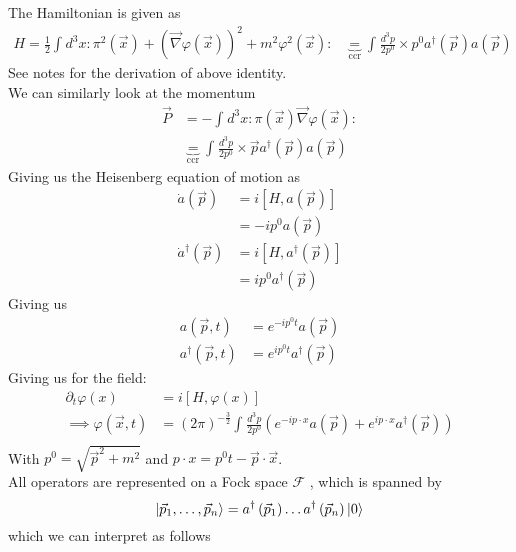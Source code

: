 \documentclass{report}
\begin{document}
The Hamiltonian is given as 
\begin{align*}
H = \frac{1}{2} \int_{}^{} d^3x : \pi^2\left( \vec{x} \right) + \left( \vec{\nabla } \varphi\left( \vec{x} \right)  \right) ^2 + m^2\varphi^2\left( \vec{x} \right) : 
 &\underbrace{=}_{\text{ccr}} \int_{}^{} \frac{d^3p}{2p^{0} } \times  p^{0} a^\dagger\left( \vec{p} \right) a\left( \vec{p} \right)
\end{align*}
See notes for the derivation of above identity.\\
We can similarly look at the momentum 
\begin{align*}
  \vec{P} &= -\int_{}^{} d^3x : \pi\left( \vec{x} \right) \vec{\nabla } \varphi\left( \vec{x} \right) :  \\
  &\underbrace{=}_{\text{ccr}} \int_{ }^{} \frac{d^3p}{2p^{0} } \times  \vec{p} a^\dagger\left( \vec{p} \right) a\left( \vec{p} \right)
\end{align*}
Giving us the Heisenberg equation of motion as
\begin{align*}
  \dot{a}\left( \vec{p} \right) &= i\left[ H, a\left( \vec{p} \right)  \right]  \\
  &= -i p^{0} a\left( \vec{p} \right)   \\
  \dot{a}^\dagger\left( \vec{p} \right) &= i \left[ H, a^\dagger\left( \vec{p} \right)  \right]  \\
  &= i p^{0} a^\dagger\left( \vec{p} \right)
\end{align*}
Giving us 
\begin{align*}
  a\left( \vec{p}, t \right) &= e^{-ip^{0} t} a\left( \vec{p} \right)  \\
  a^\dagger\left( \vec{p}, t \right) &= e^{ip^{0} t} a^\dagger\left( \vec{p} \right)
\end{align*}
Giving us for the field: 
\begin{align*}
  \partial_t \varphi\left( x \right) &= i\left[ H, \varphi\left( x \right)  \right]  \\ 
  \implies \varphi\left( \vec{x},t \right) &= \left( 2\pi \right) ^{-\frac{3}{2} } \int_{}^{} \frac{d^3p}{2p^{0} } \left( e^{-ip\cdot x} a\left( \vec{p} \right) + e^{ip\cdot x} a^\dagger\left( \vec{p} \right)  \right)   \\
\end{align*}
With $p^{0 } = \sqrt{\vec{p}^2 + m^2} $ and $p\cdot x = p^{0} t - \vec{p}\cdot \vec{x}$.\\
All operators are represented on a Fock space $\mathcal{F} $ , which is spanned by \[
\ket{\vec{p}_1, \ldots, \vec{p}_n} = a^\dagger\left( \vec{p}_1 \right) \ldots a^\dagger\left( \vec{p}_n \right) \ket{0} 
\] which we can interpret as follows
\end{document}
